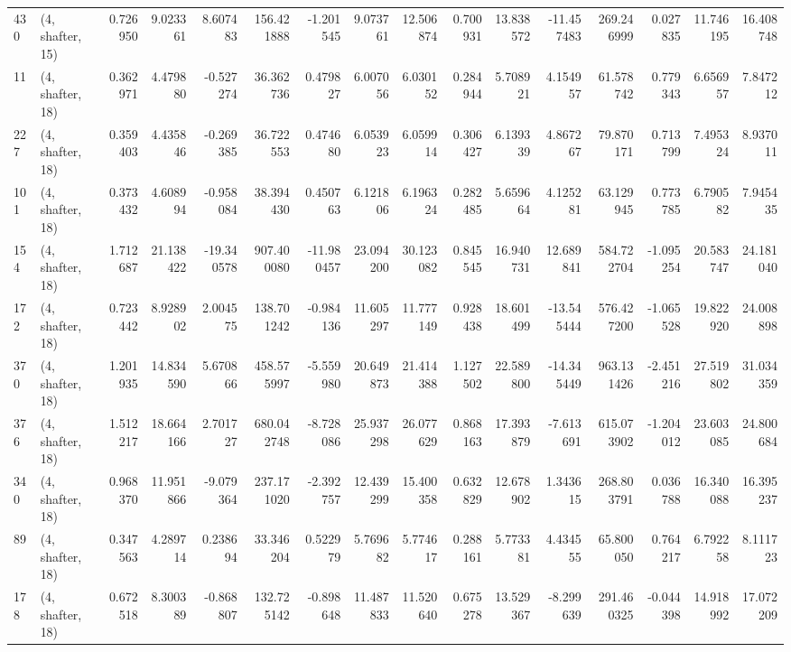 \begin{tabular}{llrrrrrrrrrrrrrr}
430 &  (4, shafter, 15) &   0.726950 &   9.023361 &   8.607483 &   156.421888 &  -1.201545 &   9.073761 &  12.506874 &  0.700931 &  13.838572 & -11.457483 &   269.246999 &   0.027835 &  11.746195 &  16.408748 \\
11  &  (4, shafter, 18) &   0.362971 &   4.479880 &  -0.527274 &    36.362736 &   0.479827 &   6.007056 &   6.030152 &  0.284944 &   5.708921 &   4.154957 &    61.578742 &   0.779343 &   6.656957 &   7.847212 \\
227 &  (4, shafter, 18) &   0.359403 &   4.435846 &  -0.269385 &    36.722553 &   0.474680 &   6.053923 &   6.059914 &  0.306427 &   6.139339 &   4.867267 &    79.870171 &   0.713799 &   7.495324 &   8.937011 \\
101 &  (4, shafter, 18) &   0.373432 &   4.608994 &  -0.958084 &    38.394430 &   0.450763 &   6.121806 &   6.196324 &  0.282485 &   5.659664 &   4.125281 &    63.129945 &   0.773785 &   6.790582 &   7.945435 \\
154 &  (4, shafter, 18) &   1.712687 &  21.138422 & -19.340578 &   907.400080 & -11.980457 &  23.094200 &  30.123082 &  0.845545 &  16.940731 &  12.689841 &   584.722704 &  -1.095254 &  20.583747 &  24.181040 \\
172 &  (4, shafter, 18) &   0.723442 &   8.928902 &   2.004575 &   138.701242 &  -0.984136 &  11.605297 &  11.777149 &  0.928438 &  18.601499 & -13.545444 &   576.427200 &  -1.065528 &  19.822920 &  24.008898 \\
370 &  (4, shafter, 18) &   1.201935 &  14.834590 &   5.670866 &   458.575997 &  -5.559980 &  20.649873 &  21.414388 &  1.127502 &  22.589800 & -14.345449 &   963.131426 &  -2.451216 &  27.519802 &  31.034359 \\
376 &  (4, shafter, 18) &   1.512217 &  18.664166 &   2.701727 &   680.042748 &  -8.728086 &  25.937298 &  26.077629 &  0.868163 &  17.393879 &  -7.613691 &   615.073902 &  -1.204012 &  23.603085 &  24.800684 \\
340 &  (4, shafter, 18) &   0.968370 &  11.951866 &  -9.079364 &   237.171020 &  -2.392757 &  12.439299 &  15.400358 &  0.632829 &  12.678902 &   1.343615 &   268.803791 &   0.036788 &  16.340088 &  16.395237 \\
89  &  (4, shafter, 18) &   0.347563 &   4.289714 &   0.238694 &    33.346204 &   0.522979 &   5.769682 &   5.774617 &  0.288161 &   5.773381 &   4.434555 &    65.800050 &   0.764217 &   6.792258 &   8.111723 \\
178 &  (4, shafter, 18) &   0.672518 &   8.300389 &  -0.868807 &   132.725142 &  -0.898648 &  11.487833 &  11.520640 &  0.675278 &  13.529367 &  -8.299639 &   291.460325 &  -0.044398 &  14.918992 &  17.072209 \\

\end{tabular}
